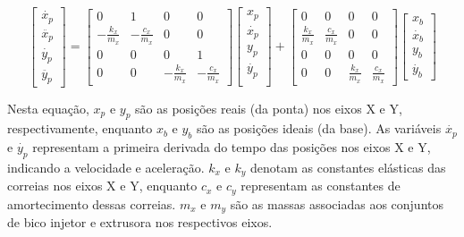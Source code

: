 \begin{equation}
    \label{eq:espaco_de_estados_din_model}
    \begin{bmatrix}
        \dot{x_p} \\
        \ddot{x_p} \\
        \dot{y_p} \\
        \ddot{y_p}
    \end{bmatrix}
    =
    \begin{bmatrix}
        0 & 1 & 0 & 0 \\
        -\frac{k_x}{m_x} & -\frac{c_x}{m_x} & 0 & 0 \\
        0 & 0 & 0 & 1 \\
        0 & 0 & -\frac{k_x}{m_x} & -\frac{c_x}{m_x}
    \end{bmatrix}
    \begin{bmatrix}
        x_p \\
        \dot{x_p} \\        
        y_p \\
        \dot{y_p} \\
    \end{bmatrix}
    +
    \begin{bmatrix}
        0 & 0 & 0 & 0 \\
        \frac{k_x}{m_x} & \frac{c_x}{m_x} & 0 & 0 \\
        0 & 0 & 0 & 0 \\
        0 & 0 & \frac{k_x}{m_x} & \frac{c_x}{m_x}
    \end{bmatrix}
    \begin{bmatrix}
        x_b \\
        \dot{x_b}  \\
        y_b \\
        \dot{y_b} 
    \end{bmatrix}
\end{equation}

Nesta equação, \(x_p\) e \(y_p\) são as posições reais (da ponta) nos eixos X e Y, respectivamente, enquanto \(x_b\) e \(y_b\) são as posições ideais (da base). As variáveis \(\dot{x_p}\) e \(\dot{y_p}\) representam a primeira derivada do tempo das posições nos eixos X e Y, indicando a velocidade e aceleração. \(k_x\) e \(k_y\) denotam as constantes elásticas das correias nos eixos X e Y, enquanto \(c_x\) e \(c_y\) representam as constantes de amortecimento dessas correias. \(m_x\) e \(m_y\) são as massas associadas aos conjuntos de bico injetor e extrusora nos respectivos eixos.

